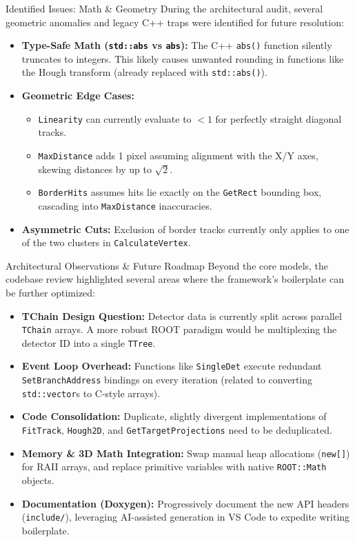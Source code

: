 \documentclass[aspectratio=169]{beamer}
\newcommand{\nologo}{\setbeamertemplate{logo}{}}
\newcommand{\nonav}{\setbeamertemplate{navigation symbols}{}}
\begin{document}
	\begin{frame}{Identified Issues: Math \& Geometry}
		During the architectural audit, several geometric anomalies and legacy C++ traps were identified for future resolution:
		
		\vspace{0.3cm}
		\begin{itemize}
			\item \textbf{Type-Safe Math (\texttt{std::abs} vs \texttt{abs}):} The C++ \texttt{abs()} function silently truncates to integers. This likely causes unwanted rounding in functions like the Hough transform (already replaced with \texttt{std::abs()}).
			\item \textbf{Geometric Edge Cases:} 
			\begin{itemize}
				\item \texttt{Linearity} can currently evaluate to $< 1$ for perfectly straight diagonal tracks.
				\item \texttt{MaxDistance} adds 1 pixel assuming alignment with the X/Y axes, skewing distances by up to $\sqrt{2}$.
				\item \texttt{BorderHits} assumes hits lie exactly on the \texttt{GetRect} bounding box, cascading into \texttt{MaxDistance} inaccuracies.
			\end{itemize}
			\item \textbf{Asymmetric Cuts:} Exclusion of border tracks currently only applies to one of the two clusters in \texttt{CalculateVertex}.
		\end{itemize}
	\end{frame}
	
	{\nologo\nonav
	\begin{frame}{Architectural Observations \& Future Roadmap}
		Beyond the core models, the codebase review highlighted several areas where the framework's boilerplate can be further optimized:
		
		\vspace{0.3cm}
		\begin{itemize}
			\item \textbf{TChain Design Question:} Detector data is currently split across parallel \texttt{TChain} arrays. A more robust ROOT paradigm would be multiplexing the detector ID into a single \texttt{TTree}.
			\item \textbf{Event Loop Overhead:} Functions like \texttt{SingleDet} execute redundant \texttt{SetBranchAddress} bindings on every iteration (related to converting \texttt{std::vector}s to C-style arrays).
			\item \textbf{Code Consolidation:} Duplicate, slightly divergent implementations of \texttt{FitTrack}, \texttt{Hough2D}, and \texttt{GetTargetProjections} need to be deduplicated.
			\item \textbf{Memory \& 3D Math Integration:} Swap manual heap allocations (\texttt{new[]}) for RAII arrays, and replace primitive variables with native \texttt{ROOT::Math} objects.
			\item \textbf{Documentation (Doxygen):} Progressively document the new API headers (\texttt{include/}), leveraging AI-assisted generation in VS Code to expedite writing boilerplate.
		\end{itemize}
	\end{frame}}
	
\end{document}
